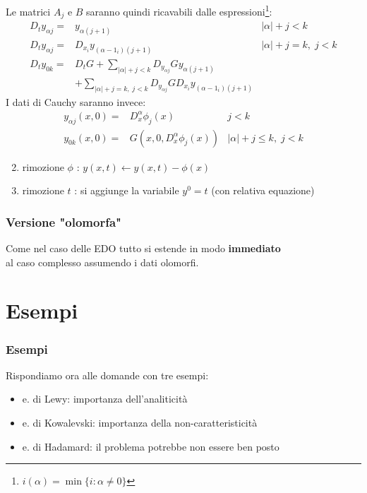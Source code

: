 \documentclass[serif,notheorems]{beamer}
\theoremstyle{definition} %
\theoremstyle{remark}
\begin{document}
\begin{frame}
Le matrici $A_j$ e $B$ saranno quindi ricavabili dalle espressioni\footnote{$i(\alpha)=\min\{ i:\alpha\neq 0 \} $}:
\begin{align*}
D_t y_{\alpha j} =& y_{\alpha (j+1)} & |\alpha| + j < k \\
D_t y_{\alpha j} =& D_{x_i} y_{(\alpha-1_i)(j+1)} & |\alpha| + j = k, \; j < k\\
D_t y_{0k} =& D_tG + \sum_{|\alpha|+j < k} D_{y_{\alpha j}}G y_{\alpha (j+1)} \\
& + \sum_{|\alpha|+j = k, \; j < k} D_{y_{\alpha j}} G D_{x_i} y_{(\alpha-1_i)(j+1)}
\end{align*}
I dati di Cauchy saranno invece:
\begin{align*}
y_{\alpha j}(x, 0) = & D_x^{\alpha} \phi_j(x) & j < k\\
y_{0k}(x, 0) = & G\left( x, 0, D_x^{\alpha} \phi_j(x) \right) & \lvert \alpha \rvert + j \leq k, \; j < k
\end{align*}
\end{frame}

\begin{frame}
\begin{enumerate}
\setcounter{enumi}{1}
\item rimozione $\phi$ : $y(x,t)\leftarrow y(x,t)-\phi (x)$
\item rimozione $t$ : si aggiunge la variabile $y^0=t$ (con relativa equazione)
\end{enumerate}
\end{frame}

\begin{frame}
\frametitle{Versione "olomorfa"}
\begin{center}
Come nel caso delle EDO tutto si estende in modo \textbf{immediato} \\
al caso complesso assumendo i dati olomorfi.
\end{center}
\end{frame}

\section{Esempi}

\begin{frame}
\frametitle{Esempi}
Rispondiamo ora alle domande con tre esempi:
\begin{itemize}
\item e. di Lewy: importanza dell'analiticità
\item e. di Kowalevski: importanza della non-caratteristicità
\item e. di Hadamard: il problema potrebbe non essere ben posto
\end{itemize}
\end{frame}
\end{document}
